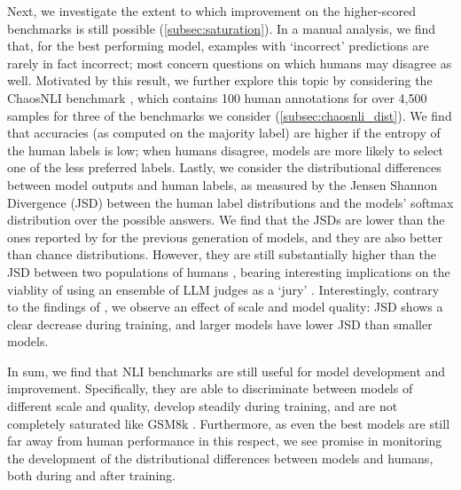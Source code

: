 Next, we investigate the extent to which improvement on the higher-scored benchmarks is still possible (\cref{subsec:saturation}).
In a manual analysis, we find that, for the best performing model, examples with `incorrect' predictions are rarely in fact incorrect; most concern questions on which humans may disagree as well.
Motivated by this result, we further explore this topic by considering the ChaosNLI benchmark \citep{nie-etal-2020-learn}, which contains 100 human annotations for over 4,500 samples for three of the benchmarks we consider (\cref{subsec:chaosnli_dist}).
We find that accuracies (as computed on the majority label) are higher if the entropy of the human labels is low; when humans disagree, models are more likely to select one of the less preferred labels.
Lastly, we consider the distributional differences between model outputs and human labels, as measured by the Jensen Shannon Divergence (JSD) between the human label distributions and the models' softmax distribution over the possible answers.
We find that the JSDs are lower than the ones reported by \citet{nie-etal-2020-learn} for the previous generation of models, and they are also better than chance distributions. 
However, they are still substantially higher than the JSD between two populations of humans \citep{baan-etal-2022-stop}, bearing interesting implications on the viablity of using an ensemble of LLM judges as a `jury' \citep[e.g.][]{verga2024replacing}.
Interestingly, contrary to the findings of \citet{nie-etal-2020-learn}, we observe an effect of scale and model quality: JSD shows a clear decrease during training, and larger models have lower JSD than smaller models.

In sum, we find that NLI benchmarks are still useful for model development and improvement.
Specifically, they are able to discriminate between models of different scale and quality, develop steadily during training, and are not completely saturated like GSM8k \citep{cobbe2021trainingverifierssolvemath}.
Furthermore, as even the best models are still far away from human performance in this respect, we see promise in monitoring the development of the distributional differences between models and humans, both during and after training.
